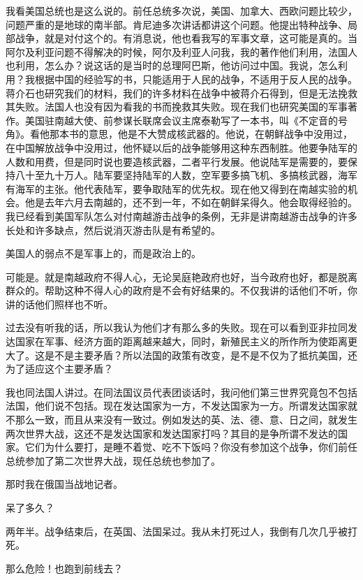我看美国总统也是这么说的。前任总统多次说，美国、加拿大、西欧问题比较少，问题严重的是地球的南半部。肯尼迪多次讲话都讲这个问题。他提出特种战争、局部战争，就是对付这个的。有消息说，他也看我写的军事文章，这可能是真的。当阿尔及利亚问题不得解决的时候，阿尔及利亚人问我，我的著作他们利用，法国人也利用，怎么办？说这话的是当时的总理阿巴斯，他访问过中国。我说，怎么利用？我根据中国的经验写的书，只能适用于人民的战争，不适用于反人民的战争。蒋介石也研究我们的材料，我们的许多材料在战争中被蒋介石得到，但是无法挽救其失败。法国人也没有因为看我的书而挽救其失败。现在我们也研究美国的军事著作。美国驻南越大使、前参谋长联席会议主席泰勒写了一本书，叫《不定音的号角》。看他那本书的意思，他是不大赞成核武器的。他说，在朝鲜战争中没用过，在中国解放战争中没用过，他怀疑以后的战争能够用这种东西制胜。他要争陆军的人数和用费，但是同时说也要造核武器，二者平行发展。他说陆军是需要的，要保持八十至九十万人。陆军要坚持陆军的人数，空军要多搞飞机、多搞核武器，海军有海军的主张。他代表陆军，要争取陆军的优先权。现在他又得到在南越实验的机会。他是去年六月去南越的，还不到一年，不如在朝鲜呆得久。他会取得经验的。我已经看到美国军队怎么对付南越游击战争的条例，无非是讲南越游击战争的许多长处和许多缺点，然后说消灭游击队是有希望的。

美国人的弱点不是军事上的，而是政治上的。

可能是。就是南越政府不得人心，无论吴庭艳政府也好，当今政府也好，都是脱离群众的。帮助这种不得人心的政府是不会有好结果的。不仅我讲的话他们不听，你讲的话他们照样也不听。

过去没有听我的话，所以我认为他们才有那么多的失败。现在可以看到亚非拉同发达国家在军事、经济方面的距离越来越大，同时，新殖民主义的所作所为使距离更大了。这是不是主要矛盾？所以法国的政策有改变，是不是不仅为了抵抗美国，还为了适应这个主要矛盾？

我也同法国人讲过。在同法国议员代表团谈话时，我问他们第三世界究竟包不包括法国，他们说不包括。现在发达国家为一方，不发达国家为一方。所谓发达国家就不那么一致，而且从来没有一致过。例如发达的英、法、德、意、日之间，就发生两次世界大战，这还不是发达国家和发达国家打吗？其目的是争所谓不发达的国家。它们为什么要打，是睡不着觉、吃不下饭吗？你没有参加这个战争，你们前任总统参加了第二次世界大战，现任总统也参加了。

那时我在俄国当战地记者。

呆了多久？

两年半。战争结束后，在英国、法国呆过。我从未打死过人，我倒有几次几乎被打死。

那么危险！也跑到前线去？

